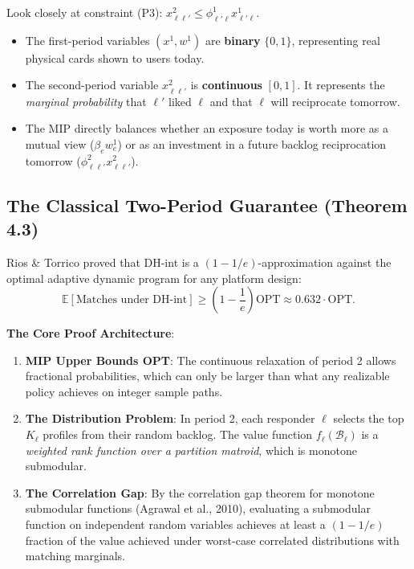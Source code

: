 \documentclass[11pt,letterpaper]{article}
\theoremstyle{definition}
\theoremstyle{plain}
\theoremstyle{remark}
\begin{document}
\begin{takeawaybox}
Look closely at constraint (P3): $x_{\ell\ell'}^2 \le \phi_{\ell'\ell}^1 x_{\ell'\ell}^1$.
\begin{itemize}[leftmargin=1.5em]
    \item The first-period variables $(x^1, w^1)$ are \textbf{binary} $\{0, 1\}$, representing real physical cards shown to users today.
    \item The second-period variable $x_{\ell\ell'}^2$ is \textbf{continuous} $[0, 1]$. It represents the \emph{marginal probability} that $\ell'$ liked $\ell$ and that $\ell$ will reciprocate tomorrow.
    \item The MIP directly balances whether an exposure today is worth more as a mutual view ($\beta_e w_e^1$) or as an investment in a future backlog reciprocation tomorrow ($\phi_{\ell\ell'}^2 x_{\ell\ell'}^2$).
\end{itemize}
\end{takeawaybox}

\subsection{The Classical Two-Period Guarantee (Theorem 4.3)}
Rios \& Torrico proved that DH-int is a $(1 - 1/e)$-approximation against the optimal adaptive dynamic program for any platform design:
\begin{equation}
    \mathbb{E}[\text{Matches under DH-int}] \ge \left(1 - \frac{1}{e}\right) \mathrm{OPT} \approx 0.632 \cdot \mathrm{OPT}.
\end{equation}

\noindent \textbf{The Core Proof Architecture}:
\begin{enumerate}[leftmargin=2em]
    \item \textbf{MIP Upper Bounds OPT}: The continuous relaxation of period 2 allows fractional probabilities, which can only be larger than what any realizable policy achieves on integer sample paths.
    \item \textbf{The Distribution Problem}: In period 2, each responder $\ell$ selects the top $K_\ell$ profiles from their random backlog. The value function $f_\ell(\mathcal{B}_\ell)$ is a \emph{weighted rank function over a partition matroid}, which is monotone submodular.
    \item \textbf{The Correlation Gap}: By the correlation gap theorem for monotone submodular functions (Agrawal et al., 2010), evaluating a submodular function on independent random variables achieves at least a $(1 - 1/e)$ fraction of the value achieved under worst-case correlated distributions with matching marginals.
\end{enumerate}
\end{document}
